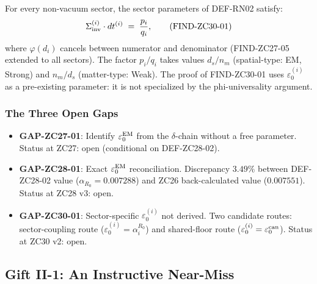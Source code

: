 \documentclass[12pt, a4paper]{article}
\begin{document}
\begin{formalbox}[title={Inherited FIND-ZC30-01 (phi-universality):
  $\Sigma_{\rm inv}^{(i)}\cdot dt^{(i)} = p_i/q_i$}]
For every non-vacuum sector, the sector parameters of
DEF-RN02 satisfy:
\begin{equation}
  \Sigma_{\rm inv}^{(i)}\cdot dt^{(i)} \;=\; \frac{p_i}{q_i},
  \tag{FIND-ZC30-01}\label{eq:phi-univ}
\end{equation}
where $\varphi(d_i)$ cancels between numerator and denominator
(FIND-ZC27-05 extended to all sectors). The factor $p_i/q_i$
takes values $d_s/n_m$ (spatial-type: EM, Strong) and
$n_m/d_s$ (matter-type: Weak). The proof of FIND-ZC30-01
uses $\varepsilon_0^{(i)}$ as a pre-existing parameter: it is
not specialized by the phi-universality argument.
\end{formalbox}

\subsubsection{The Three Open Gaps}

\begin{keybox}[title={Open gaps inherited by ZC37}]
\begin{itemize}[leftmargin=*, noitemsep]
  \item \textbf{GAP-ZC27-01}: Identify $\varepsilon_0^{\rm EM}$
    from the $\delta$-chain without a free parameter.
    Status at ZC27: open (conditional on DEF-ZC28-02).
  \item \textbf{GAP-ZC28-01}: Exact $\varepsilon_0^{\rm EM}$
    reconciliation. Discrepancy $3.49\%$ between
    DEF-ZC28-02 value ($\alpha_{R_0} = 0.007288$) and
    ZC26 back-calculated value ($0.007551$).
    Status at ZC28 v3: open.
  \item \textbf{GAP-ZC30-01}: Sector-specific $\varepsilon_0^{(i)}$
    not derived. Two candidate routes: sector-coupling route
    ($\varepsilon_0^{(i)} = \alpha_i^{R_0}$) and shared-floor
    route ($\varepsilon_0^{(i)} = \varepsilon_0^{\rm can}$).
    Status at ZC30 v2: open.
\end{itemize}
\end{keybox}

\subsection{Gift II-1: An Instructive Near-Miss}
\label{sec:gift-ii-1}
\end{document}

